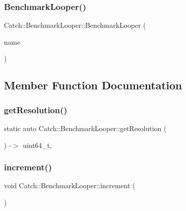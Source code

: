 \subsubsection{BenchmarkLooper()}
{\footnotesize\ttfamily Catch\+::\+Benchmark\+Looper\+::\+Benchmark\+Looper (\begin{DoxyParamCaption}\item[{\textbf{ String\+Ref}}]{name }\end{DoxyParamCaption})\hspace{0.3cm}{\ttfamily [inline]}}



\subsection{Member Function Documentation}
\mbox{\label{class_catch_1_1_benchmark_looper_a45fd79f05ac1fb21dcfb3a81cf052705}} 
\subsubsection{getResolution()}
{\footnotesize\ttfamily static auto Catch\+::\+Benchmark\+Looper\+::get\+Resolution (\begin{DoxyParamCaption}{ }\end{DoxyParamCaption}) -\/$>$  uint64\+\_\+t\hspace{0.3cm}{\ttfamily [static]}, {\ttfamily [private]}}

\mbox{\label{class_catch_1_1_benchmark_looper_a210552aff5b19408637444d4bb35d59c}} 
\subsubsection{increment()}
{\footnotesize\ttfamily void Catch\+::\+Benchmark\+Looper\+::increment (\begin{DoxyParamCaption}{ }\end{DoxyParamCaption})\hspace{0.3cm}{\ttfamily [inline]}}

\mbox{\label{class_catch_1_1_benchmark_looper_a97bd944521f519b1593a5d1d2f9998fa}} 
